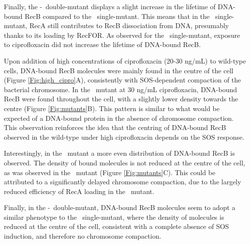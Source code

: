 Finally, the \dreca-\teneighty\ double-mutant displays a slight increase in the lifetime of DNA-bound RecB compared to the \teneighty\ single-mutant. This means that in the \teneighty\ single-mutant, RecA still contributes to RecB dissociation from DNA, presumably thanks to its loading by RecFOR. As observed for the \teneighty\ single-mutant, exposure to ciprofloxacin did not increase the lifetime of DNA-bound RecB.



Upon addition of high concentrations of ciprofloxacin (20-30 ng/mL) to wild-type cells, DNA-bound RecB molecules were mainly found in the centre of the cell (Figure \ref{Fig:high_cipro}A), consistently with SOS-dependent compaction of the bacterial chromosome. In the \dreca\ mutant at 30 ng/mL ciprofloxacin, DNA-bound RecB were found throughout the cell, with a slightly lower density towards the centre (Figure \ref{Fig:mutants}B). This pattern is similar to what would be expected of a DNA-bound protein in the absence of chromosome compaction\cite{Stracy2021}. This observation reinforces the idea that the centring of DNA-bound RecB observed in the wild-type under high ciprofloxacin depends on the SOS response.

Interestingly, in the \teneighty\ mutant a more even distribution of DNA-bound RecB is observed. The density of bound molecules is not reduced at the centre of the cell, as was observed in the \dreca\ mutant (Figure \ref{Fig:mutants}C). This could be attributed to a significantly delayed chromosome compaction, due to the largely reduced efficiency of RecA loading in the \teneighty\ mutant.

Finally, in the \dreca-\teneighty\ double-mutant, DNA-bound RecB molecules seem to adopt a similar phenotype to the \dreca\ single-mutant, where the density of molecules is reduced at the centre of the cell, consistent with a complete absence of SOS induction, and therefore no chromosome compaction.

